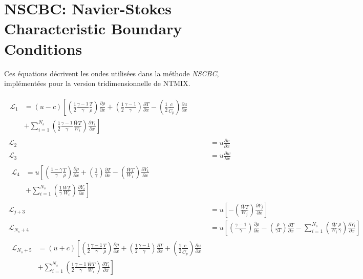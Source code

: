 \section{NSCBC: Navier-Stokes Characteristic Boundary Conditions}\label{app:nscbc}

Ces équations décrivent les ondes utilisées dans la méthode \textit{NSCBC}, implémentées pour la version tridimensionnelle de NTMIX. 


\begin{subequations}
\begin{align}
  \begin{split}
    \mathcal{L}_1&=(u-c)\left[ \left( \frac{1}{2} \frac{\gamma -1}{\gamma} \frac{T}{\rho} \right) \frac{\partial \rho}{\partial x} + \left( \frac{1}{2} \frac{\gamma -1}{\gamma} \right) \frac{\partial T}{\partial x}  -  \left( \frac{1}{2} \frac{c}{\overline{C}_p}  \right) \frac{\partial u}{\partial x} \right.\\
      &\left. + \sum_{i=1}^{N_s} \left(  \frac{1}{2} \frac{\gamma -1}{\gamma} \frac{\overline{W}T}{W_i} \right) \frac{\partial Y_i}{\partial x}   \right]
  \end{split}\label{eq:l1}\\
~
  \mathcal{L}_2&= u \frac{\partial v}{\partial x}\label{eq:l2}\\
~
  \mathcal{L}_3&= u \frac{\partial w}{\partial x}\label{eq:l3}\\
~
  \begin{split}
    \mathcal{L}_4&=u \left[ \left( \frac{1- \gamma}{\gamma} \frac{T}{\rho} \right) \frac{\partial \rho}{\partial x} + \left( \frac{1}{\gamma} \right) \frac{\partial T}{\partial x} - \left( \frac{\overline{W}T}{W_1} \right) \frac{\partial Y_1}{\partial x} \right. \\
      &\left. + \sum_{i=1}^{N_s} \left(  \frac{1}{\gamma} \frac{\overline{W}T}{W_i} \right) \frac{\partial Y_i}{\partial x}  \right]
    \end{split}\\
~
  \mathcal{L}_{j+3}&=u  \left[ - \left( \frac{\overline{W}T}{W_j} \right) \frac{\partial Y_j}{\partial x} \right]\\
~
  \mathcal{L}_{N_s+4}&=u \left[ \left( \frac{\gamma -1}{\gamma} \right) \frac{\partial \rho}{\partial x} - \left( \frac{\rho}{\gamma T} \right) \frac{\partial T}{\partial x} - \sum_{i=1}^{N_s} \left(  \frac{\overline{W}}{W_i} \frac{\rho}{\gamma} \right) \frac{\partial Y_i}{\partial x}  \right]\\
~
  \begin{split}
    \mathcal{L}_{N_s+5}&=(u+c)\left[ \left( \frac{1}{2} \frac{\gamma -1}{\gamma} \frac{T}{\rho} \right) \frac{\partial \rho}{\partial x} + \left( \frac{1}{2} \frac{\gamma -1}{\gamma} \right) \frac{\partial T}{\partial x}  +  \left( \frac{1}{2} \frac{c}{\overline{C}_p}  \right) \frac{\partial u}{\partial x} \right.\\
      &\left. + \sum_{i=1}^{N_s} \left(  \frac{1}{2} \frac{\gamma -1}{\gamma} \frac{\overline{W}T}{W_i} \right) \frac{\partial Y_i}{\partial x}   \right]
  \end{split}\label{eq:llast}
\end{align}
\end{subequations}




